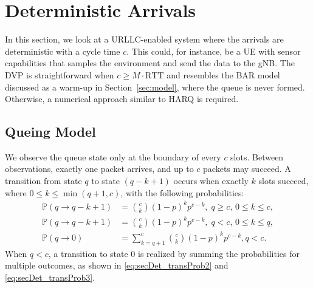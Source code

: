 \section{Deterministic Arrivals}\label{sec:detArr}
In this section, we look at a URLLC-enabled system where the arrivals are deterministic with a cycle time $c$. This could, for instance, be a UE with sensor capabilities that samples the environment and send the data to the gNB. 
The DVP is straightforward when $c\geq M\cdot\text{RTT}$ and resembles the BAR model discussed as a warm-up in Section~\ref{sec:model}, where the queue is never formed.
Otherwise, a numerical approach similar to HARQ is required.
\subsection{Queing Model}
We observe the queue state only at the boundary of every $c$ slots. Between observations, exactly one packet arrives, and up to $c$ packets may succeed. A transition from state $q$ to state $(q-k+1)$ occurs when exactly $k$ slots succeed, where $0 \leq k \leq \min(q+1, c)$, with the following probabilities:
\begin{align}
\mathbb{P}(q \to q-k+1) &= \binom{c}{k} (1-p)^k p^{c-k},\;q\geq c,\,0\leq k \leq c,\label{eq:secDet_transProb1}\\   
\mathbb{P}(q \to q-k+1) &= \binom{c}{k} (1-p)^k p^{c-k},\;q<c,\,0\leq k\leq q,\label{eq:secDet_transProb2}\\  
\mathbb{P}(q \to 0) &= \sum_{k=q+1}^{c}\binom{c}{k} (1-p)^k p^{c-k},q<c.\label{eq:secDet_transProb3}
\end{align}
When $q < c$, a transition to state 0 is realized by summing the probabilities for multiple outcomes, as shown in \eqref{eq:secDet_transProb2} and \eqref{eq:secDet_transProb3}.

